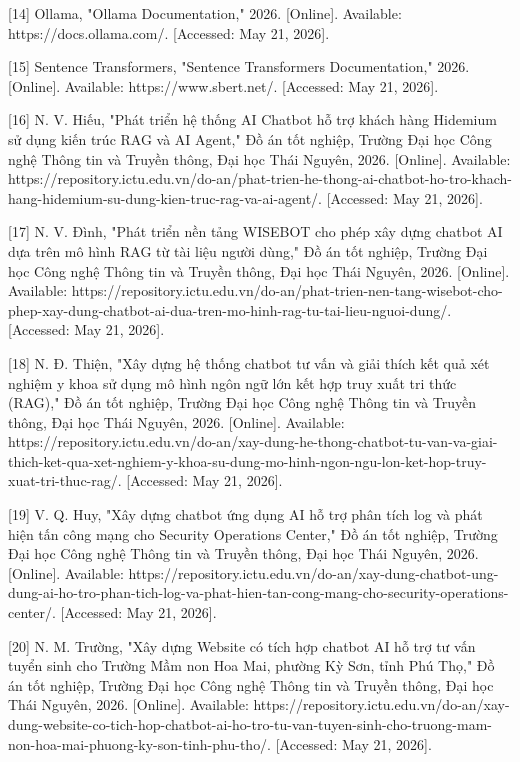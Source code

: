 {[}14{]} Ollama, "Ollama Documentation," 2026. {[}Online{]}. Available:
https://docs.ollama.com/. {[}Accessed: May 21, 2026{]}.

{[}15{]} Sentence Transformers, "Sentence Transformers Documentation,"
2026. {[}Online{]}. Available: https://www.sbert.net/. {[}Accessed: May
21, 2026{]}.

{[}16{]} N. V. Hiếu, "Phát triển hệ thống AI Chatbot hỗ trợ khách hàng
Hidemium sử dụng kiến trúc RAG và AI Agent," Đồ án tốt nghiệp, Trường
Đại học Công nghệ Thông tin và Truyền thông, Đại học Thái Nguyên, 2026.
{[}Online{]}. Available:
https://repository.ictu.edu.vn/do-an/phat-trien-he-thong-ai-chatbot-ho-tro-khach-hang-hidemium-su-dung-kien-truc-rag-va-ai-agent/.
{[}Accessed: May 21, 2026{]}.

{[}17{]} N. V. Đình, "Phát triển nền tảng WISEBOT cho phép xây dựng
chatbot AI dựa trên mô hình RAG từ tài liệu người dùng," Đồ án tốt
nghiệp, Trường Đại học Công nghệ Thông tin và Truyền thông, Đại học Thái
Nguyên, 2026. {[}Online{]}. Available:
https://repository.ictu.edu.vn/do-an/phat-trien-nen-tang-wisebot-cho-phep-xay-dung-chatbot-ai-dua-tren-mo-hinh-rag-tu-tai-lieu-nguoi-dung/.
{[}Accessed: May 21, 2026{]}.

{[}18{]} N. Đ. Thiện, "Xây dựng hệ thống chatbot tư vấn và giải thích
kết quả xét nghiệm y khoa sử dụng mô hình ngôn ngữ lớn kết hợp truy xuất
tri thức (RAG)," Đồ án tốt nghiệp, Trường Đại học Công nghệ Thông tin và
Truyền thông, Đại học Thái Nguyên, 2026. {[}Online{]}. Available:
https://repository.ictu.edu.vn/do-an/xay-dung-he-thong-chatbot-tu-van-va-giai-thich-ket-qua-xet-nghiem-y-khoa-su-dung-mo-hinh-ngon-ngu-lon-ket-hop-truy-xuat-tri-thuc-rag/.
{[}Accessed: May 21, 2026{]}.

{[}19{]} V. Q. Huy, "Xây dựng chatbot ứng dụng AI hỗ trợ phân tích log
và phát hiện tấn công mạng cho Security Operations Center," Đồ án tốt
nghiệp, Trường Đại học Công nghệ Thông tin và Truyền thông, Đại học Thái
Nguyên, 2026. {[}Online{]}. Available:
https://repository.ictu.edu.vn/do-an/xay-dung-chatbot-ung-dung-ai-ho-tro-phan-tich-log-va-phat-hien-tan-cong-mang-cho-security-operations-center/.
{[}Accessed: May 21, 2026{]}.

{[}20{]} N. M. Trường, "Xây dựng Website có tích hợp chatbot AI hỗ trợ
tư vấn tuyển sinh cho Trường Mầm non Hoa Mai, phường Kỳ Sơn, tỉnh Phú
Thọ," Đồ án tốt nghiệp, Trường Đại học Công nghệ Thông tin và Truyền
thông, Đại học Thái Nguyên, 2026. {[}Online{]}. Available:
https://repository.ictu.edu.vn/do-an/xay-dung-website-co-tich-hop-chatbot-ai-ho-tro-tu-van-tuyen-sinh-cho-truong-mam-non-hoa-mai-phuong-ky-son-tinh-phu-tho/.
{[}Accessed: May 21, 2026{]}.


